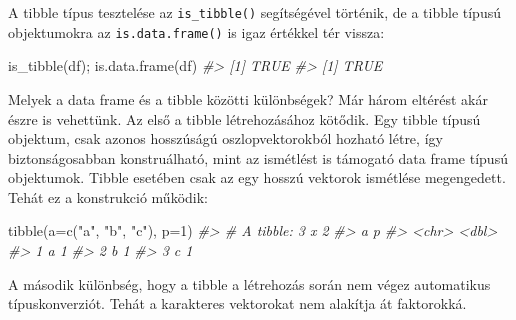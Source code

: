 \documentclass[
]{book}
\newenvironment{Shaded}{\begin{snugshade}}{\end{snugshade}}
\newcommand{\AttributeTok}[1]{\textcolor[rgb]{0.77,0.63,0.00}{#1}}
\newcommand{\CommentTok}[1]{\textcolor[rgb]{0.56,0.35,0.01}{\textit{#1}}}
\newcommand{\DecValTok}[1]{\textcolor[rgb]{0.00,0.00,0.81}{#1}}
\newcommand{\FunctionTok}[1]{\textcolor[rgb]{0.00,0.00,0.00}{#1}}
\newcommand{\NormalTok}[1]{#1}
\newcommand{\StringTok}[1]{\textcolor[rgb]{0.31,0.60,0.02}{#1}}
\begin{document}
A tibble típus tesztelése az \texttt{is\_tibble()} segítségével történik, de a tibble típusú objektumokra az \texttt{is.data.frame()} is igaz értékkel tér vissza:

\begin{Shaded}
\begin{Highlighting}[]
\FunctionTok{is\_tibble}\NormalTok{(df); }\FunctionTok{is.data.frame}\NormalTok{(df)}
\CommentTok{\#\textgreater{} [1] TRUE}
\CommentTok{\#\textgreater{} [1] TRUE}
\end{Highlighting}
\end{Shaded}

Melyek a data frame és a tibble közötti különbségek? Már három eltérést akár észre is vehettünk. Az első a tibble létrehozásához kötődik. Egy tibble típusú objektum, csak azonos hosszúságú oszlopvektorokból hozható létre, így biztonságosabban konstruálható, mint az ismétlést is támogató data frame típusú objektumok. Tibble esetében csak az egy hosszú vektorok ismétlése megengedett. Tehát ez a konstrukció működik:

\begin{Shaded}
\begin{Highlighting}[]
\FunctionTok{tibble}\NormalTok{(}\AttributeTok{a=}\FunctionTok{c}\NormalTok{(}\StringTok{"a"}\NormalTok{, }\StringTok{"b"}\NormalTok{, }\StringTok{"c"}\NormalTok{), }\AttributeTok{p=}\DecValTok{1}\NormalTok{)}
\CommentTok{\#\textgreater{} \# A tibble: 3 x 2}
\CommentTok{\#\textgreater{}   a         p}
\CommentTok{\#\textgreater{}   \textless{}chr\textgreater{} \textless{}dbl\textgreater{}}
\CommentTok{\#\textgreater{} 1 a         1}
\CommentTok{\#\textgreater{} 2 b         1}
\CommentTok{\#\textgreater{} 3 c         1}
\end{Highlighting}
\end{Shaded}

A második különbség, hogy a tibble a létrehozás során nem végez automatikus típuskonverziót. Tehát a karakteres vektorokat nem alakítja át faktorokká.

\begin{Shaded}
\end{Shaded}
\end{document}

